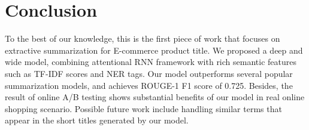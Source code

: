 \section{Conclusion}

To the best of our knowledge, 
this is the first piece of work that focuses on 
extractive summarization for E-commerce product title.
We proposed a deep and wide model, combining attentional RNN
framework with rich semantic features such as TF-IDF scores and NER tags.
Our model outperforms several popular summarization models,
and achieves ROUGE-1 F1 score of 0.725.
Besides, the result of online A/B testing shows substantial benefits
of our model in real online shopping scenario.
Possible future work include handling similar terms
that appear in the short titles generated by our model.
